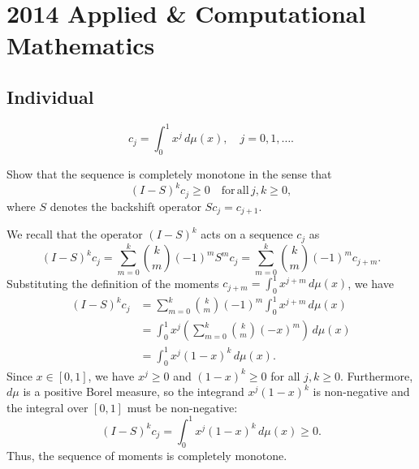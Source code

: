 \section{2014 Applied \& Computational Mathematics}

\subsection{Individual}

\begin{exercise}
\label{applied:2014:1}
\[
c_{j}=\int_{0}^{1}x^{j}\,d\mu(x),\quad j=0,1,\dots.
\]

Show that the sequence is completely monotone in the sense that
\[
(I-S)^{k}c_{j}\geq 0\quad\mathrm{for\,all}\,j,k\geq 0,
\]
where $S$ denotes the backshift operator $Sc_{j}=c_{j+1}$.
\end{exercise}

\begin{solution}
We recall that the operator $(I-S)^k$ acts on a sequence $c_j$ as
\[
(I-S)^k c_j = \sum_{m=0}^k \binom{k}{m} (-1)^m S^m c_j = \sum_{m=0}^k \binom{k}{m} (-1)^m c_{j+m}.
\]
Substituting the definition of the moments $c_{j+m} = \int_{0}^{1} x^{j+m} \, d\mu(x)$, we have
\begin{align*}
(I-S)^k c_j &= \sum_{m=0}^k \binom{k}{m} (-1)^m \int_{0}^{1} x^{j+m} \, d\mu(x) \\
&= \int_{0}^{1} x^j \left( \sum_{m=0}^k \binom{k}{m} (-x)^m \right) \, d\mu(x) \\
&= \int_{0}^{1} x^j (1-x)^k \, d\mu(x).
\end{align*}
Since $x \in [0,1]$, we have $x^j \geq 0$ and $(1-x)^k \geq 0$ for all $j, k \geq 0$. Furthermore, $d\mu$ is a positive Borel measure, so the integrand $x^j (1-x)^k$ is non-negative and the integral over $[0,1]$ must be non-negative:
\[
(I-S)^k c_j = \int_{0}^{1} x^j (1-x)^k \, d\mu(x) \geq 0.
\]
Thus, the sequence of moments is completely monotone.
\end{solution}


